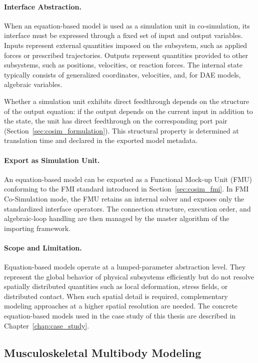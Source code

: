 \paragraph{Interface Abstraction.}
When an equation-based model is used as a simulation unit in co-simulation, its interface must be expressed through a fixed set of input and output variables.
Inputs represent external quantities imposed on the subsystem, such as applied forces or prescribed trajectories.
Outputs represent quantities provided to other subsystems, such as positions, velocities, or reaction forces.
The internal state typically consists of generalized coordinates, velocities, and, for DAE models, algebraic variables.

Whether a simulation unit exhibits direct feedthrough depends on the structure of the output equation: if the output depends on the current input in addition to the state, the unit has direct feedthrough on the corresponding port pair (Section~\ref{sec:cosim_formulation}).
This structural property is determined at translation time and declared in the exported model metadata.

\paragraph{Export as Simulation Unit.}
An equation-based model can be exported as a Functional Mock-up Unit (FMU) conforming to the FMI standard introduced in Section~\ref{sec:cosim_fmi}.
In FMI Co-Simulation mode, the FMU retains an internal solver and exposes only the standardized interface operators.
The connection structure, execution order, and algebraic-loop handling are then managed by the master algorithm of the importing framework.

\paragraph{Scope and Limitation.}
Equation-based models operate at a lumped-parameter abstraction level.
They represent the global behavior of physical subsystems efficiently but do not resolve spatially distributed quantities such as local deformation, stress fields, or distributed contact.
When such spatial detail is required, complementary modeling approaches at a higher spatial resolution are needed.
The concrete equation-based models used in the case study of this thesis are described in Chapter~\ref{chap:case_study}.

\subsection{Musculoskeletal Multibody Modeling}
\label{sec:modeling_musculoskeletal}


